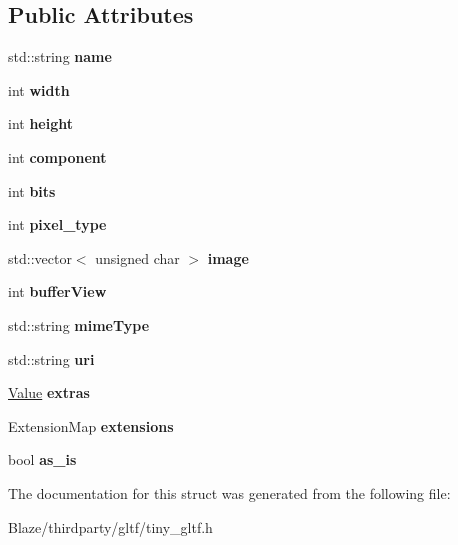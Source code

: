 \subsection*{Public Attributes}
\begin{DoxyCompactItemize}
\item 
\mbox{\label{structtinygltf_1_1Image_a493a19aba0baa604e61cac89998a70a6}} 
std\+::string {\bfseries name}
\item 
\mbox{\label{structtinygltf_1_1Image_a8d9d5e281e9a3f2edfda8819e3c265ae}} 
int {\bfseries width}
\item 
\mbox{\label{structtinygltf_1_1Image_a20c4f1224272bd5e467f46a49c27a2b7}} 
int {\bfseries height}
\item 
\mbox{\label{structtinygltf_1_1Image_ab515c1cd50ce724a6ee8a343688035ea}} 
int {\bfseries component}
\item 
\mbox{\label{structtinygltf_1_1Image_a49b015704d002eaf33fda1f49aca5c90}} 
int {\bfseries bits}
\item 
\mbox{\label{structtinygltf_1_1Image_aeab1d625a0c806f256679da7eb361da3}} 
int {\bfseries pixel\+\_\+type}
\item 
\mbox{\label{structtinygltf_1_1Image_ad8dd65409296e49cba2d733f021d5d3c}} 
std\+::vector$<$ unsigned char $>$ {\bfseries image}
\item 
\mbox{\label{structtinygltf_1_1Image_a8f78252a9d2dc3e6aaf55418c03fd1df}} 
int {\bfseries buffer\+View}
\item 
\mbox{\label{structtinygltf_1_1Image_a4decc3e4ed189bacf64012cc2e471df9}} 
std\+::string {\bfseries mime\+Type}
\item 
\mbox{\label{structtinygltf_1_1Image_acd2a89301ea0c44293386fab52694c90}} 
std\+::string {\bfseries uri}
\item 
\mbox{\label{structtinygltf_1_1Image_a6c7a8832aa750150eca1531588e636d8}} 
\hyperlink{classtinygltf_1_1Value}{Value} {\bfseries extras}
\item 
\mbox{\label{structtinygltf_1_1Image_aa5220bacf13dfb5757d377280c05ed24}} 
Extension\+Map {\bfseries extensions}
\item 
\mbox{\label{structtinygltf_1_1Image_a8e2d9f442e61d14328d91aa134ed8d96}} 
bool {\bfseries as\+\_\+is}
\end{DoxyCompactItemize}


The documentation for this struct was generated from the following file\+:\begin{DoxyCompactItemize}
\item 
Blaze/thirdparty/gltf/tiny\+\_\+gltf.\+h\end{DoxyCompactItemize}
